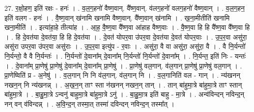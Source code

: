 \documentclass[17pt]{extarticle}
\begin{document}
27. र॒क्षो॒हण॒ इति॑ रक्षः - हनः॑ । . व॒ल॒ग॒हनो॑ वैष्ण॒वान्. वै᳚ष्ण॒वान्. व॑लग॒हनो॑ वलग॒हनो॑ वैष्ण॒वान् । . व॒ल॒ग॒हन॒ इति॑ वलग - हनः॑ । . वै॒ष्ण॒वान् ख॑नामि खनामि वैष्ण॒वान्. वै᳚ष्ण॒वान् ख॑नामि । . ख॒ना॒मीतीति॑ खनामि खना॒मीति॑ । . इत्या॑हा॒हे तीत्या॑ह । . आ॒ह॒ वै॒ष्ण॒वा वै᳚ष्ण॒वा आ॑हाह वैष्ण॒वाः । . वै॒ष्ण॒वा हि हि वै᳚ष्ण॒वा वै᳚ष्ण॒वा हि । . हि दे॒वत॑या दे॒वत॑या॒ हि हि दे॒वत॑या । . दे॒वत॑ योपर॒वा उ॑पर॒वा दे॒वत॑या दे॒वत॑ योपर॒वाः । . उ॒प॒र॒वा असु॑रा॒ असु॑रा उपर॒वा उ॑पर॒वा असु॑राः । . उ॒प॒र॒वा इत्यु॑प - र॒वाः । . असु॑रा॒ वै वा असु॑रा॒ असु॑रा॒ वै । . वै नि॒र्यन्तो॑ नि॒र्यन्तो॒ वै वै नि॒र्यन्तः॑ । . नि॒र्यन्तो॑ दे॒वाना᳚म् दे॒वाना᳚म् नि॒र्यन्तो॑ नि॒र्यन्तो॑ दे॒वाना᳚म् । . नि॒र्यन्त॒ इति॑ निः - यन्तः॑ । . दे॒वाना᳚म् प्रा॒णेषु॑ प्रा॒णेषु॑ दे॒वाना᳚म् दे॒वाना᳚म् प्रा॒णेषु॑ । . प्रा॒णेषु॑ वल॒गान्. व॑ल॒गान् प्रा॒णेषु॑ प्रा॒णेषु॑ वल॒गान् । . प्रा॒णेष्विति॑ प्र - अ॒नेषु॑ । . व॒ल॒गान् नि नि व॑ल॒गान्. व॑ल॒गान् नि । . व॒ल॒गानिति॑ वल - गान् । . न्य॑खनन् नखन॒न् नि न्य॑खनन्न् । . अ॒ख॒न॒न् ताꣳ स्ता न॑खनन् नखन॒न् तान् । . तान् बा॑हुमा॒त्रे बा॑हुमा॒त्रे ताꣳ स्तान् बा॑हुमा॒त्रे । . बा॒हु॒मा॒त्रे ऽन्वनु॑ बाहुमा॒त्रे बा॑हुमा॒त्रे ऽनु॑ । . बा॒हु॒मा॒त्र इति॑ बाहु - मा॒त्रे । . अन्व॑विन्दन् नविन्द॒न् नन् वन् व॑विन्दन्न् । . अ॒वि॒न्द॒न् तस्मा॒त् तस्मा॑ दविन्दन् नविन्द॒न् तस्मा᳚त् । \newline
\end{document}
